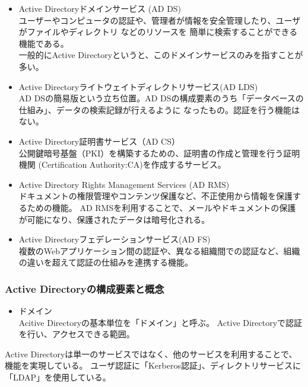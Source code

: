 \documentclass[11pt,a4j,titlepage]{jreport}
\begin{document}
\begin{itemize}

    \item  Active Directoryドメインサービス (AD DS)\mbox{}\\
    ユーザーやコンピュータの認証や、管理者が情報を安全管理したり、ユーザがファイルやディレクトリ などのリソースを
    簡単に検索することができる機能である\cite{activedirectorydomainservices}。\\
    一般的にActive Directoryというと、このドメインサービスのみを指すことが多い。
    
    \item Active Directoryライトウェイトディレクトリサービス(AD LDS)\mbox{}\\
    AD DSの簡易版という立ち位置。AD DSの構成要素のうち「データベースの仕組み」、データの検索記録が行えるように
    なったもの。認証を行う機能はない。

    \item Active Directory証明書サービス（AD CS）\mbox{}\\
    公開鍵暗号基盤（PKI）を構築するための、証明書の作成と管理を行う証明機関 (Certification Authority:CA)を作成するサービス。
    
    \item Active Directory Rights Management Services (AD RMS)\mbox{}\\
    ドキュメントの権限管理やコンテンツ保護など、不正使用から情報を保護するための機能。
    AD RMSを利用することで、メールやドキュメントの保護が可能になり、保護されたデータは暗号化される。

    \item Active Directoryフェデレーションサービス(AD FS)\mbox{}\\
    複数のWebアプリケーション間の認証や、異なる組織間での認証など、組織の違いを超えて認証の仕組みを連携する機能。

\end{itemize}




\subsubsection*{Active Directoryの構成要素と概念}

\begin{itemize}
    \item ドメイン\mbox{}\\
    Acitive Directoryの基本単位を「ドメイン」と呼ぶ。
    Active Directoryで認証を行い、アクセスできる範囲。

\end{itemize}
Active Directoryは単一のサービスではなく、他のサービスを利用することで、機能を実現している。
ユーザ認証に「Kerberos認証」、ディレクトリサービスに「LDAP」を使用している。
\end{document}
